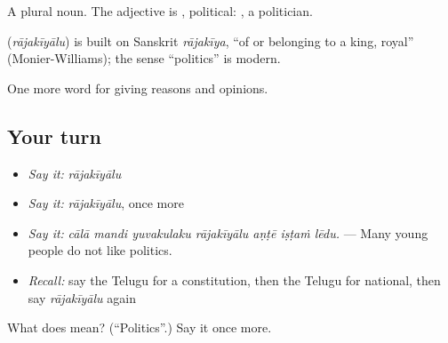 A plural noun. The adjective is , political:  , a politician.

\begin{cousinweb}
\textbf{} (\emph{rājakīyālu}) is built on Sanskrit \emph{rājakīya}, \textquotedblleft{}of or belonging to a king, royal\textquotedblright{} (Monier-Williams); the sense \textquotedblleft{}politics\textquotedblright{} is modern.
\end{cousinweb}

\begin{grammarlens}[title={What you've built}]
One more word for giving reasons and opinions.
\end{grammarlens}

\subsection*{Your turn}
\begin{itemize}
\raggedright
  \item \emph{Say it:} \emph{rājakīyālu}
  \item \emph{Say it:} \emph{rājakīyālu}, once more
  \item \emph{Say it:} \emph{cālā mandi yuvakulaku rājakīyālu aṇṭē iṣṭaṁ lēdu.} — Many young people do not like politics.
  \item \emph{Recall:} say the Telugu for a constitution, then the Telugu for national, then say \emph{rājakīyālu} again
\end{itemize}

\begin{tcolorbox}[breakable,colback=teal!4,colframe=teal!35!black,title={Before you move on}]
What does  mean? (\textquotedblleft{}Politics\textquotedblright{}.) Say it once more.
\end{tcolorbox}
